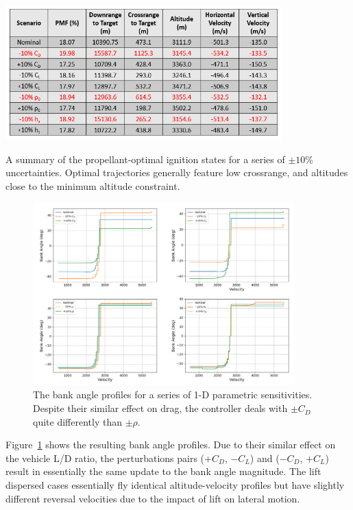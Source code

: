 \documentclass[letterpaper, paper,11pt]{AAS}
\begin{document}
\begin{table}[h!]
	\centering
	\includegraphics[width=0.8\textwidth]{ParametricSensitivityIgnitionTable} 
	\caption{A summary of the propellant-optimal ignition states for a series of $\pm10\%$ uncertainties. Optimal trajectories generally feature low crossrange, and altitudes close to the minimum altitude constraint.}
	\label{table_parametric_ignition}
\end{table}
\begin{figure}[h!]
	\centering
	\includegraphics[width=0.9\textwidth]{SensitivityBankProfiles} 
	\caption{The bank angle profiles for a series of 1-D parametric sensitivities. Despite their similar effect on drag, the controller deals with $\pm C_D$ quite differently than $\pm \rho$.}
	\label{fig_parametric_bank}
\end{figure}

Figure~\ref{fig_parametric_bank} shows the resulting bank angle profiles. Due to their similar effect on the vehicle L/D ratio, the perturbations pairs  ($ +C_D $, $ -C_L $) and ($ -C_D $, $ +C_L $) result in essentially the same update to the bank angle magnitude. The lift dispersed cases essentially fly identical altitude-velocity profiles but have slightly different reversal velocities due to the impact of lift on lateral motion. 
\end{document}
